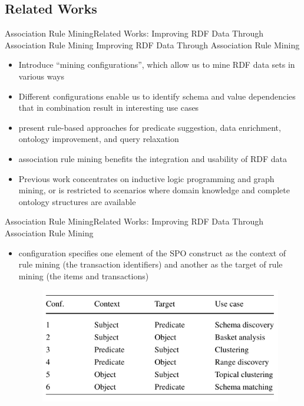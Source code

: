 \documentclass[10pt]{beamer}
\begin{document}
\subsection{Related Works}

\begin{frame}{Association Rule Mining}{Related Works:  Improving RDF Data Through Association Rule Mining}
Improving RDF Data Through Association Rule Mining \cite{abedjan2013improving}
\begin{itemize}
	
	\item Introduce “mining configurations”, which allow us to mine RDF data sets in various ways
	\item Different configurations enable us to identify schema and value dependencies that in combination result in interesting use cases
	\item present rule-based approaches for predicate suggestion, data enrichment, ontology improvement, and query relaxation
	\item association rule mining benefits the integration and usability of RDF data
	\item Previous work concentrates on inductive logic programming and graph mining, or is restricted to scenarios where domain knowledge and complete ontology structures are available
\end{itemize}
\end{frame}

\begin{frame}{Association Rule Mining}{Related Works:  Improving RDF Data Through Association Rule Mining}

\begin{itemize}
\item configuration specifies one element of the SPO construct as the context of rule mining (the transaction identifiers) and another as the target of rule mining (the items and transactions)

\begin{figure} 
	\includegraphics[width=.6\linewidth]{images/rule-config.PNG}
\end{figure}

\end{itemize}
\end{frame}
\end{document}
